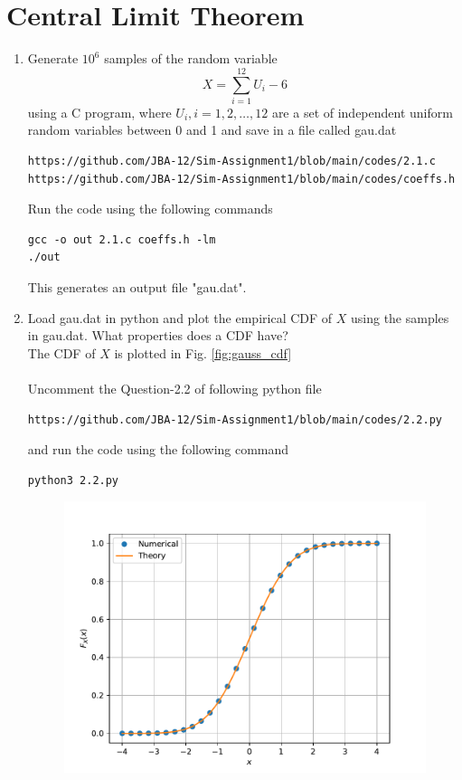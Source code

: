 \documentclass[journal,12pt,twocolumn]{IEEEtran}
\renewcommand\thesection{\arabic{section}}
\begin{document}
\section{Central Limit Theorem}
%
\begin{enumerate}[label=\thesection.\arabic*
,ref=\thesection.\theenumi]
%
\item
Generate $10^6$ samples of the random variable
%
\begin{equation}
X = \sum_{i=1}^{12}U_i -6
\end{equation}
%
using a C program, where $U_i, i = 1,2,\dots, 12$ are  a set of independent uniform random variables between 0 and 1
and save in a file called gau.dat\\
\solution
\begin{lstlisting}
https://github.com/JBA-12/Sim-Assignment1/blob/main/codes/2.1.c
https://github.com/JBA-12/Sim-Assignment1/blob/main/codes/coeffs.h
\end{lstlisting}
Run the code using the following commands
\begin{lstlisting}
gcc -o out 2.1.c coeffs.h -lm
./out
\end{lstlisting}
This generates an output file "gau.dat".\\
\item
Load gau.dat in python and plot the empirical CDF of $X$ using the samples in gau.dat. What properties does a CDF have?
\\
\solution The CDF of $X$ is plotted in Fig. \ref{fig:gauss_cdf} \\\\
Uncomment the Question-2.2 of following python file
\begin{lstlisting}
https://github.com/JBA-12/Sim-Assignment1/blob/main/codes/2.2.py
\end{lstlisting}
and run the code using the following command
\begin{lstlisting}
python3 2.2.py
\end{lstlisting}
\begin{figure}[!htbp]
\centering
\includegraphics[width=\columnwidth]{./figs/gau_cdf}

\end{figure}
\end{enumerate}
\end{document}
